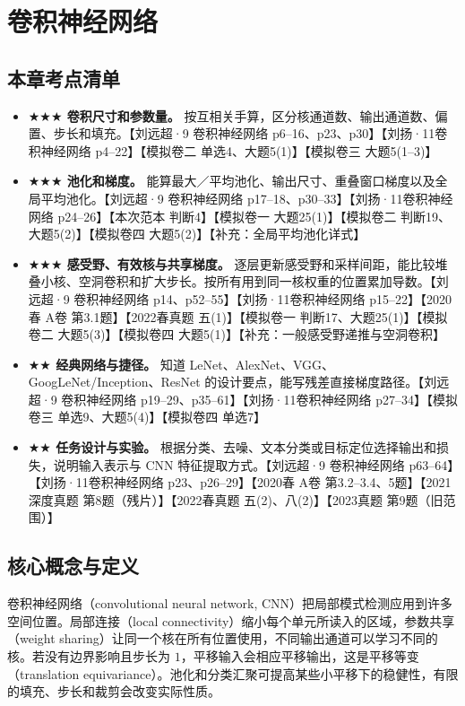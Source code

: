 \documentclass[UTF8,a4paper,zihao=-4,fontset=fandol]{ctexrep}
\begin{document}
\chapter{卷积神经网络}

\section{本章考点清单}

\begin{itemize}
\item \textbf{\(\bigstar\bigstar\bigstar\) 卷积尺寸和参数量。} 按互相关手算，区分核通道数、输出通道数、偏置、步长和填充。【刘远超·9 卷积神经网络 p6--16、p23、p30】【刘扬·11卷积神经网络 p4--22】【模拟卷二 单选4、大题5(1)】【模拟卷三 大题5(1--3)】
\item \textbf{\(\bigstar\bigstar\bigstar\) 池化和梯度。} 能算最大／平均池化、输出尺寸、重叠窗口梯度以及全局平均池化。【刘远超·9 卷积神经网络 p17--18、p30--33】【刘扬·11卷积神经网络 p24--26】【本次范本 判断4】【模拟卷一 大题25(1)】【模拟卷二 判断19、大题5(2)】【模拟卷四 大题5(2)】【补充：全局平均池化详式】
\item \textbf{\(\bigstar\bigstar\bigstar\) 感受野、有效核与共享梯度。} 逐层更新感受野和采样间距，能比较堆叠小核、空洞卷积和扩大步长。按所有用到同一核权重的位置累加导数。【刘远超·9 卷积神经网络 p14、p52--55】【刘扬·11卷积神经网络 p15--22】【2020春 A卷 第3.1题】【2022春真题 五(1)】【模拟卷一 判断17、大题25(1)】【模拟卷二 大题5(3)】【模拟卷四 大题5(1)】【补充：一般感受野递推与空洞卷积】
\item \textbf{\(\bigstar\bigstar\) 经典网络与捷径。} 知道 LeNet、AlexNet、VGG、GoogLeNet/Inception、ResNet 的设计要点，能写残差直接梯度路径。【刘远超·9 卷积神经网络 p19--29、p35--61】【刘扬·11卷积神经网络 p27--34】【模拟卷三 单选9、大题5(4)】【模拟卷四 单选7】
\item \textbf{\(\bigstar\bigstar\) 任务设计与实验。} 根据分类、去噪、文本分类或目标定位选择输出和损失，说明输入表示与 CNN 特征提取方式。【刘远超·9 卷积神经网络 p63--64】【刘扬·11卷积神经网络 p23、p26--29】【2020春 A卷 第3.2--3.4、5题】【2021深度真题 第8题（残片）】【2022春真题 五(2)、八(2)】【2023真题 第9题（旧范围）】
\end{itemize}

\section{核心概念与定义}

卷积神经网络（convolutional neural network, CNN）把局部模式检测应用到许多空间位置。局部连接（local connectivity）缩小每个单元所读入的区域，参数共享（weight sharing）让同一个核在所有位置使用，不同输出通道可以学习不同的核。若没有边界影响且步长为 $1$，平移输入会相应平移输出，这是平移等变（translation equivariance）。池化和分类汇聚可提高某些小平移下的稳健性，有限的填充、步长和裁剪会改变实际性质。
\end{document}
